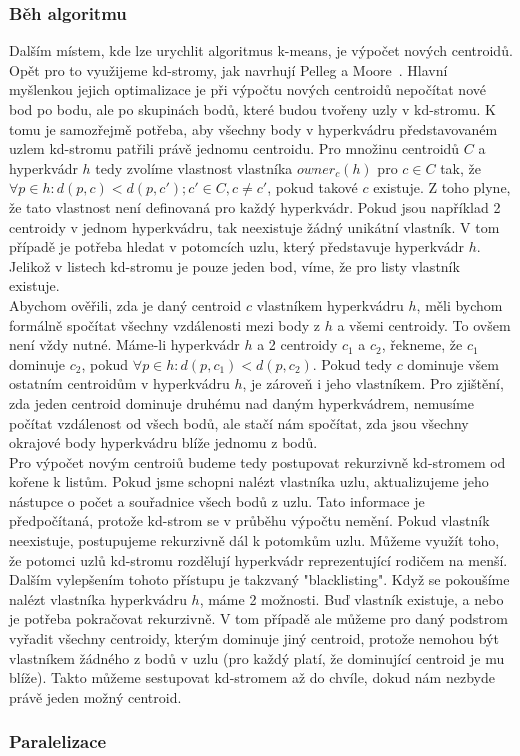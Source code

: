 \subsubsection{Běh algoritmu}
Dalším místem, kde lze urychlit algoritmus k-means, je výpočet nových centroidů. Opět pro to využijeme kd-stromy, jak navrhují Pelleg a Moore~\cite{pelleg99}. Hlavní myšlenkou jejich optimalizace je při výpočtu nových centroidů nepočítat nové bod po bodu, ale po skupinách bodů, které budou tvořeny uzly v kd-stromu. K tomu je samozřejmě potřeba, aby všechny body v hyperkvádru představovaném uzlem kd-stromu patřili právě jednomu centroidu. Pro množinu centroidů $C$ a hyperkvádr $h$ tedy zvolíme vlastnost vlastníka $owner_c(h)$ pro $c \in C$ tak, že $\forall p \in h: d(p,c) < d(p,c'); c' \in C, c \ne c'$, pokud takové $c$ existuje. Z toho plyne, že tato vlastnost není definovaná pro každý hyperkvádr. Pokud jsou například 2 centroidy v jednom hyperkvádru, tak neexistuje žádný unikátní vlastník. V tom případě je potřeba hledat v potomcích uzlu, který představuje hyperkvádr $h$. Jelikož v listech kd-stromu je pouze jeden bod, víme, že pro listy vlastník existuje.\\

Abychom ověřili, zda je daný centroid $c$ vlastníkem hyperkvádru $h$, měli bychom formálně spočítat všechny vzdálenosti mezi body z $h$ a všemi centroidy. To ovšem není vždy nutné. Máme-li hyperkvádr $h$ a 2 centroidy $c_1$ a $c_2$, řekneme, že $c_1$ dominuje $c_2$, pokud $\forall p \in h: d(p,c_1) < d(p,c_2)$. Pokud tedy $c$ dominuje všem ostatním centroidům v hyperkvádru $h$, je zároveň i jeho vlastníkem. Pro zjištění, zda jeden centroid dominuje druhému nad daným hyperkvádrem, nemusíme počítat vzdálenost od všech bodů, ale stačí nám spočítat, zda jsou všechny okrajové body hyperkvádru blíže jednomu z bodů.\\

Pro výpočet novým centroiů budeme tedy postupovat rekurzivně kd-stromem od kořene k listům. Pokud jsme schopni nalézt vlastníka uzlu, aktualizujeme jeho nástupce o počet a souřadnice všech bodů z uzlu. Tato informace je předpočítaná, protože kd-strom se v průběhu výpočtu nemění. Pokud vlastník neexistuje, postupujeme rekurzivně dál k potomkům uzlu. Můžeme využít toho, že potomci uzlů kd-stromu rozdělují hyperkvádr reprezentující rodičem na menší.\\

Dalším vylepšením tohoto přístupu je takzvaný "blacklisting". Když se pokoušíme nalézt vlastníka hyperkvádru $h$, máme 2 možnosti. Buď vlastník existuje, a nebo je potřeba pokračovat rekurzivně. V tom případě ale můžeme pro daný podstrom vyřadit všechny centroidy, kterým dominuje jiný centroid, protože nemohou být vlastníkem žádného z bodů v uzlu (pro každý platí, že dominující centroid je mu blíže). Takto můžeme sestupovat kd-stromem až do chvíle, dokud nám nezbyde právě jeden možný centroid.

\subsubsection{Paralelizace}
